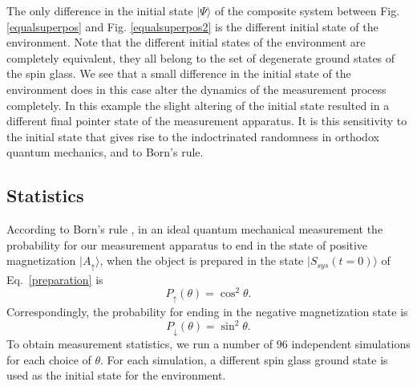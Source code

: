 \documentclass[showpacs,preprintnumbers,amsmath,amssymb,12pt]{revtex4-2}
\begin{document}
The only difference in the initial state $|\Psi\rangle$ of the
composite system between Fig. \ref{equalsuperpos} and
Fig. \ref{equalsuperpos2} is the different initial state of the
environment. Note that the different initial states of the environment
are completely equivalent, they all belong to the set of degenerate
ground states of the spin glass. We see that a small difference in the
initial state of the environment does in this case alter the dynamics
of the measurement process completely. In this example the slight
altering of the initial state resulted in a different final pointer
state of the measurement apparatus. It is this sensitivity to the
initial state that gives rise to the indoctrinated randomness in
orthodox quantum mechanics, and to Born's rule.


\subsection{Statistics}
According to Born's rule \cite{born}, in an ideal quantum mechanical
measurement the probability for our measurement apparatus to end in
the state of positive magnetization $|A_{\uparrow}\rangle$,
when the object is prepared in the state $|S_{sys}(t \!=\! 0) \rangle$ of
Eq.~\eqref{preparation} is
%
\begin{equation}
  P_\uparrow(\theta) = \cos^2{\theta}.
\label{prob2}
\end{equation}
%
Correspondingly, the probability for ending in the negative
magnetization state is
%
\begin{equation}
  P_\downarrow(\theta) = \sin^2{\theta}.
\label{prob3}
\end{equation}
%
To obtain measurement statistics, we run a number of $96$ independent
simulations for each choice of $\theta$. For each simulation, a
different spin glass ground state is used as the initial state for the
environment.
\end{document}
